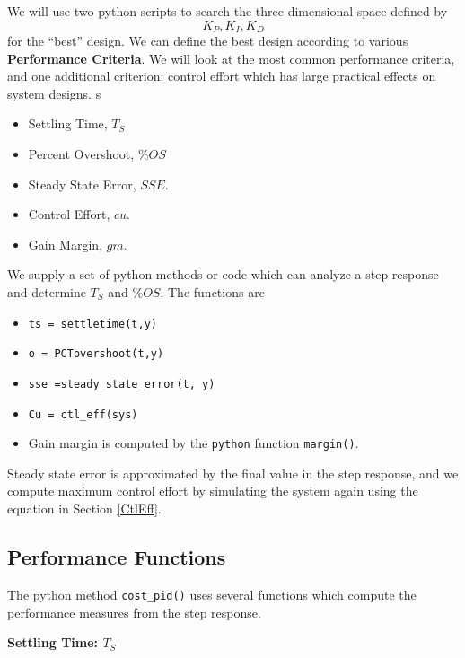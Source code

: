 We will use two python scripts to search the three dimensional space defined by
\[
K_P, K_I, K_D
\]
for the ``best'' design.  We can define the best design according to various {\bf Performance Criteria}.
We will look at the most common performance criteria, and one additional criterion: control effort which
has large practical effects on system designs.
s
\begin{itemize}
  \item Settling Time, $T_S$
  \item Percent Overshoot, $\%OS$
  \item Steady State Error, $SSE$.
  \item Control Effort, $cu$.
  \item Gain Margin, $gm$.
\end{itemize}

We supply a set of python methods or code which can analyze a step response and determine $T_S$ and $\%OS$.
The functions are

\begin{itemize}
  \item {\tt ts = settletime(t,y)}
  \item {\tt o = PCTovershoot(t,y)}
  \item {\tt sse =steady\_state\_error(t, y) }
  \item {\tt Cu = ctl\_eff(sys) }
  \item Gain margin is computed by the {\tt python} function {\tt margin()}.
\end{itemize}

Steady state error is approximated by the final value in the step response, and we compute maximum control effort by simulating the system again using the equation in Section \ref{CtlEff}.	%






\subsection{Performance Functions}

The python method {\tt cost\_pid()} uses several functions which compute the performance measures from the step response.

{\bf Settling Time: $T_S$}

